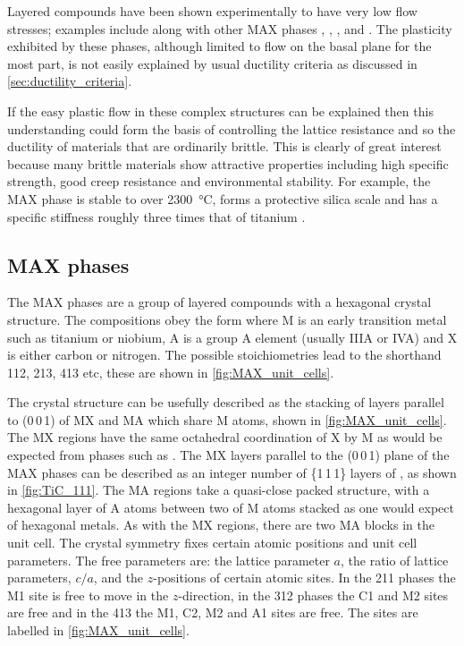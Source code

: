 
Layered compounds have been shown experimentally to have very low flow stresses; examples include  along with other MAX phases \cite{Barsoum2011},  \cite{Korte2012NbCo},  \cite{Telle2006},  and  \cite{Sygnatowicz2015}. The plasticity exhibited by these phases, although limited to flow on the basal plane for the most part, is not easily explained by usual ductility criteria as discussed in \autoref{sec:ductility_criteria}. 

If the easy plastic flow in these complex structures can be explained then this understanding could form the basis of controlling the lattice resistance and so the ductility of materials that are ordinarily brittle. This is clearly of great interest because many brittle materials show attractive properties including high specific strength, good creep resistance and environmental stability. For example, the MAX phase  is stable to over \SI{2300}{\celsius}, forms a protective silica scale and has a specific stiffness roughly three times that of titanium \cite{Radovic2013}.

\subsection{MAX phases}

The MAX phases are a group of layered compounds with a hexagonal crystal structure. The compositions obey the form  where M is an early transition metal such as titanium or niobium, A is a group A element (usually IIIA or IVA) and X is either carbon or nitrogen. The possible stoichiometries lead to the shorthand 112, 213, 413 etc, these are shown in \autoref{fig:MAX_unit_cells}.

The crystal structure can be usefully described as the stacking of layers parallel to (0\,0\,1) of MX and MA which share M atoms,  shown in \autoref{fig:MAX_unit_cells}. The MX regions have the same octahedral coordination of X by M as would be expected from phases such as . The MX layers parallel to the (0\,0\,1) plane of the MAX phases can be described as an integer number of \{1\,1\,1\} layers of , as shown in \autoref{fig:TiC_111}. The MA regions take a quasi-close packed structure, with a hexagonal layer of A atoms between two of M atoms stacked as one would expect of hexagonal metals. As with the MX regions, there are two MA blocks in the unit cell. The crystal symmetry fixes certain atomic positions and unit cell parameters. The free parameters are: the lattice parameter $a$, the ratio of lattice parameters, $c/a$, and the $z$-positions of certain atomic sites. In the 211 phases the M1 site is free to move in the $z$-direction, in the 312 phases the C1 and M2 sites are free and in the 413 the M1, C2, M2 and A1 sites are free. The sites are labelled in \autoref{fig:MAX_unit_cells}.


